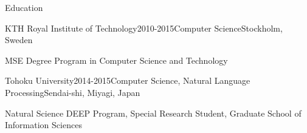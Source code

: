 \documentclass{resume} %
\begin{document}

\begin{rSection}{Education}

\begin{rSubsection}{KTH Royal Institute of Technology}{2010-2015}{Computer Science}{Stockholm, Sweden}
\item MSE Degree Program in Computer Science and Technology
\end{rSubsection}

\begin{rSubsection}{Tohoku University}{2014-2015}{Computer Science, Natural Language Processing}{Sendai-shi, Miyagi, Japan}
\item Natural Science DEEP Program, Special Research Student, Graduate School of Information Sciences
\end{rSubsection}

\end{rSection}

\end{document}
